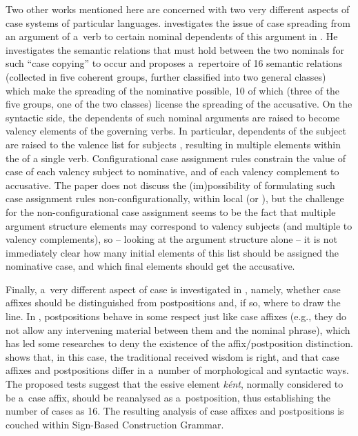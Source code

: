 \documentclass[output=paper,biblatex,babelshorthands,newtxmath,draftmode,colorlinks,citecolor=brown]{langscibook}
\begin{document}
\begin{exe}
\begin{xlist}
\begin{exe}
\begin{xlist}
Two other works mentioned here are concerned with two very different aspects of case systems of
particular languages.  \citet{ryu:13} investigates the issue of case spreading from an argument of
a~verb to certain nominal dependents of this argument in .  He investigates the semantic
relations that must hold between the two nominals for such “case copying” to occur and proposes
a~repertoire of 16 semantic relations (collected in five coherent groups, further classified into
two general classes) which make the spreading of the nominative possible, 10 of which (three of the
five groups, one of the two classes) license the spreading of the accusative.  On the syntactic
side, the dependents of such nominal arguments are raised to become valency elements of the
governing verbs.  In particular, dependents of the subject are raised to the valence list
for subjects , resulting in multiple elements within the \subjl of a single verb. Configurational
case assignment rules constrain the value of case of each valency subject to nominative, and of each
valency complement to accusative.  The paper does not discuss the (im)possibility of formulating
such case assignment rules non-configurationally, within local  (or ), but
the challenge for the non-configurational case assignment seems to be the fact that multiple
argument structure elements may correspond to valency subjects (and multiple to valency
complements), so – looking at the argument structure alone – it is not immediately clear how many
initial elements of this list should be assigned the nominative case, and which final elements
should get the accusative.

Finally, a~very different aspect of  case is investigated in \citet{thui:11}, namely,
whether case affixes should be distinguished from postpositions and, if so, where to draw the line.
In , postpositions behave in some respect just like case affixes (e.g., they do not
allow any intervening material between them and the nominal phrase), which has led some researches
to deny the existence of the affix/postposition distinction.  \citet{thui:11} shows that, in this case, the
traditional received wisdom is right, and that case affixes and postpositions differ in a~number of
morphological and syntactic ways.  The proposed tests suggest that the essive element
\emph{k{\'e}nt}, normally considered to be a~case affix, should be reanalysed as a~postposition,
thus establishing the number of  cases as 16.  The resulting analysis of
 case affixes and postpositions is couched within Sign-Based Construction
  Grammar\indexsbcg \citep{BS2012a-ed}.


\end{xlist}
\end{exe}
\end{xlist}
\end{exe}
\end{document}
